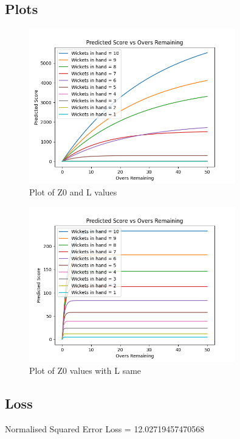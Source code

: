 \documentclass[12pt]{article}
\begin{document}
\subsection{Plots}
\begin{figure}[h]
    \centering
    \includegraphics[width=0.8\textwidth]{plot1.png}
    \caption{Plot of Z0 and L values}
\end{figure}
\begin{figure}[h]
    \centering
    \includegraphics[width=0.8\textwidth]{plot2.png}
    \caption{Plot of Z0 values with L same}
\end{figure}
\subsection{Loss}
Normalised Squared Error Loss = 12.02719457470568
\end{document}
